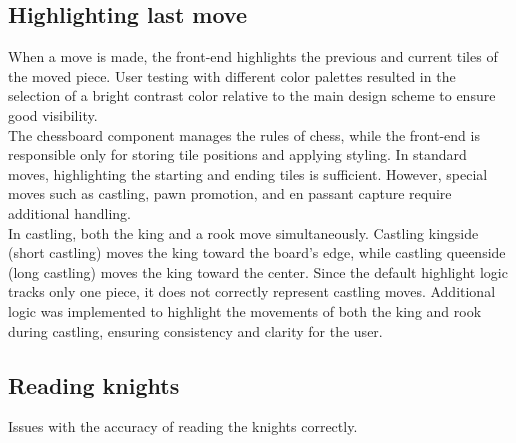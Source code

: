 \subsection{Highlighting last move}
When a move is made, the front-end highlights the previous and current tiles of the moved piece. User testing with different color palettes resulted in the selection of a bright contrast color relative to the main design scheme to ensure good visibility. \\

The chessboard component manages the rules of chess, while the front-end is responsible only for storing tile positions and applying styling. In standard moves, highlighting the starting and ending tiles is sufficient. However, special moves such as castling, pawn promotion, and en passant capture require additional handling. \\

In castling, both the king and a rook move simultaneously. Castling kingside (short castling) moves the king toward the board's edge, while castling queenside (long castling) moves the king toward the center. Since the default highlight logic tracks only one piece, it does not correctly represent castling moves. Additional logic was implemented to highlight the movements of both the king and rook during castling, ensuring consistency and clarity for the user.

\subsection{Reading knights}
Issues with the accuracy of reading the knights correctly.
